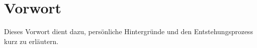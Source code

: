 \chapter*{Vorwort}
Dieses Vorwort dient dazu, persönliche Hintergründe und den Entstehungsprozess kurz zu erläutern.
